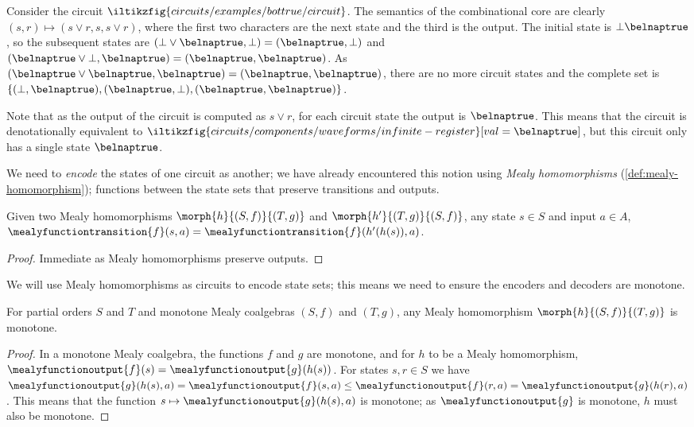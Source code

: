 \documentclass{lmcs}
\begin{document}
\begin{exa}\label{ex:circuit-states}
    Consider the circuit \(
    \iltikzfig{circuits/examples/bottrue/circuit}
    \).
    The semantics of the combinational core are clearly
    \((s, r) \mapsto \left(s \lor r, s, s \lor r\right)\), where the first two characters are the
    next state and the third is the output.
    The initial state is \(\bot\belnaptrue\), so the subsequent states are
    \((\bot \lor \belnaptrue, \bot) = (\belnaptrue,\bot)\) and
    \((\belnaptrue \lor \bot, \belnaptrue) = (\belnaptrue, \belnaptrue)\).
    As \((\belnaptrue \lor \belnaptrue, \belnaptrue) = (\belnaptrue, \belnaptrue)\),
    there are no more circuit states and the complete set is
    \(\{(\bot, \belnaptrue),(\belnaptrue,\bot),(\belnaptrue,\belnaptrue)\}\).

    Note that as the output of the circuit is computed as \(s \lor r\), for each
    circuit state the output is \(\belnaptrue\).
    This means that the circuit is denotationally equivalent to \(
    \iltikzfig{circuits/components/waveforms/infinite-register}[val=\belnaptrue]
    \), but this circuit only has a single state \(\belnaptrue\).
\end{exa}

We need to \emph{encode} the states of one circuit as another; we have already
encountered this notion using \emph{Mealy homomorphisms}
(\autoref{def:mealy-homomorphism});
functions between the state sets that preserve transitions and outputs.

\begin{lem}
    Given two Mealy homomorphisms \(\morph{h}{(S,f)}{(T,g)}\) and
    \(\morph{h^\prime}{(T,g)}{(S,f)}\), any state \(s \in S\) and input
    \(a \in A\), \(
    \mealyfunctiontransition{f}(s, a)
    =
    \mealyfunctiontransition{f}(h^\prime(h(s)), a)
    \).
\end{lem}
\begin{proof}
    Immediate as Mealy homomorphisms preserve outputs.
\end{proof}

We will use Mealy homomorphisms as circuits to encode state sets; this means we
need to ensure the encoders and decoders are monotone.

\begin{lem}
    For partial orders \(S\) and \(T\) and monotone Mealy coalgebras
    \((S,f)\) and \((T,g)\), any Mealy homomorphism \(\morph{h}{(S,f)}{(T,g)}\)
    is monotone.
\end{lem}
\begin{proof}
    In a monotone Mealy coalgebra, the functions \(f\) and \(g\) are monotone,
    and for \(h\) to be a Mealy homomorphism, \(
    \mealyfunctionoutput{f}(s)
    =
    \mealyfunctionoutput{g}(h(s))
    \).
    For states \(s,r \in S\) we have \(
    \mealyfunctionoutput{g}(h(s), a)
    =
    \mealyfunctionoutput{f}(s, a)
    \leq
    \mealyfunctionoutput{f}(r, a)
    =
    \mealyfunctionoutput{g}(h(r), a)
    \).
    This means that the function \(
    s \mapsto \mealyfunctionoutput{g}(h(s), a)
    \) is monotone; as \(\mealyfunctionoutput{g}\) is monotone, \(h\) must
    also be monotone.
\end{proof}
\end{document}
